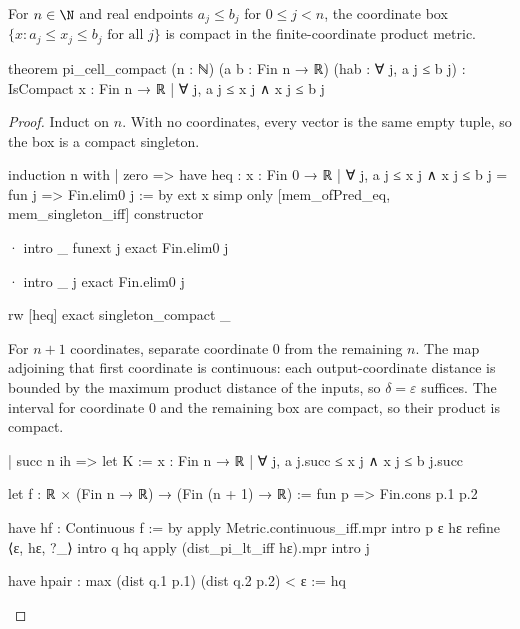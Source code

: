 \begin{lemma}
  \label{ma:lem:pi-cell-compact}
  For $n\in\N$ and real endpoints $a_j\leq b_j$ for $0\leq j<n$, the coordinate box $\{x: a_j\leq
    x_j\leq b_j\text{ for all }j\}$ is compact in the finite-coordinate product metric.

  \begin{lean}
    theorem pi_cell_compact (n : ℕ) (a b : Fin n → ℝ) (hab : ∀ j, a j ≤ b j) :
        IsCompact {x : Fin n → ℝ | ∀ j, a j ≤ x j ∧ x j ≤ b j}
  \end{lean}
\end{lemma}

\begin{proof}
  Induct on $n$.
  With no coordinates, every vector is the same empty tuple, so the box is a compact singleton.

  \begin{lean}
    induction n with
    | zero =>
      have heq : {x : Fin 0 → ℝ | ∀ j, a j ≤ x j ∧ x j ≤ b j} = {fun j => Fin.elim0 j} := by
        ext x
        simp only [mem_ofPred_eq, mem_singleton_iff]
        constructor

        · intro _
          funext j
          exact Fin.elim0 j

        · intro _ j
          exact Fin.elim0 j

      rw [heq]
      exact singleton_compact _
  \end{lean}

  For $n+1$ coordinates, separate coordinate $0$ from the remaining $n$.
  The map adjoining that first coordinate is continuous: each output-coordinate distance is bounded
  by the maximum product distance of the inputs, so $\delta=\varepsilon$ suffices.
  The interval for coordinate $0$ and the remaining box are compact, so their product is compact.

  \begin{lean}
    | succ n ih =>
      let K := {x : Fin n → ℝ | ∀ j, a j.succ ≤ x j ∧ x j ≤ b j.succ}

      let f : ℝ × (Fin n → ℝ) → (Fin (n + 1) → ℝ) := fun p => Fin.cons p.1 p.2

      have hf : Continuous f := by
        apply Metric.continuous_iff.mpr
        intro p ε hε
        refine ⟨ε, hε, ?_⟩
        intro q hq
        apply (dist_pi_lt_iff hε).mpr
        intro j

        have hpair : max (dist q.1 p.1) (dist q.2 p.2) < ε := hq


\end{lean}
\end{proof}
